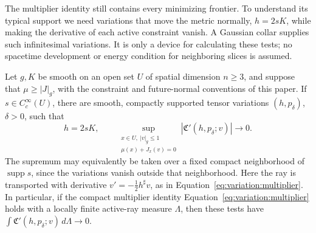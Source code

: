 The multiplier identity still contains every minimizing frontier. To
understand its typical support we need variations that move the metric
normally, $h=2sK$, while making the derivative of each active constraint
vanish. A Gaussian collar supplies such infinitesimal variations. It
is only a device for calculating these tests; no spacetime development
or energy condition for neighboring slices is assumed.


\begin{lemma}\label{lem:variation:dust-tests}
Let $g,K$ be smooth on an open set $U$ of spatial dimension $n\geq3$, and
suppose that $\mu\geq |J|_g$, with the constraint and future-normal
conventions of this paper.  If $s\in C_c^\infty(U)$, there are smooth,
compactly supported tensor variations $(h,p_\delta)$, $\delta>0$, such that
\[
 h=2sK,\qquad
 \sup_{\substack{x\in U,\ |v|_g\leq1\\ \mu(x)+J_x(v)=0}}
 |\mathfrak C'(h,p_\delta;v)|\longrightarrow0.
\]
The supremum may equivalently be taken over a fixed compact neighborhood
of $\operatorname{supp}s$, since the variations vanish outside that
neighborhood.  Here the ray is transported with derivative
$v'=-\tfrac12h^\sharp v$, as in Equation~\eqref{eq:variation:multiplier}.
In particular, if the compact multiplier identity
Equation~\eqref{eq:variation:multiplier} holds with a locally finite active-ray
measure $\Lambda$, then these tests have
$\int\mathfrak C'(h,p_\delta;v)\,d\Lambda\to0$.
\end{lemma}

